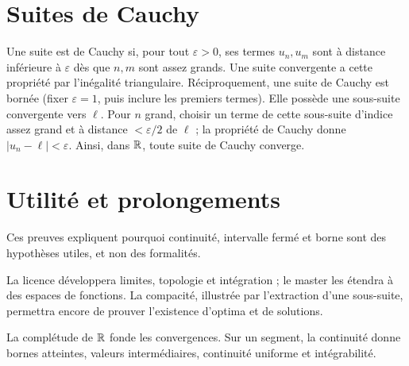 \documentclass[../cours_1re.tex]{subfiles}
\begin{document}
\begin{finchapitre}
\section{Suites de Cauchy}
Une suite est de Cauchy si, pour tout $\varepsilon>0$, ses termes $u_n,u_m$
sont à distance inférieure à $\varepsilon$ dès que $n,m$ sont assez grands.
Une suite convergente a cette propriété par l'inégalité triangulaire.
Réciproquement, une suite de Cauchy est bornée (fixer $\varepsilon=1$,
puis inclure les premiers termes). Elle possède une sous-suite convergente
vers $\ell$. Pour $n$ grand, choisir un terme de cette sous-suite
d'indice assez grand et à distance $<\varepsilon/2$ de $\ell$ ;
la propriété de Cauchy donne $|u_n-\ell|<\varepsilon$.
Ainsi, dans $\mathbb{R}$, toute suite de Cauchy converge.


\section{Utilité et prolongements}
Ces preuves expliquent pourquoi continuité, intervalle fermé et borne
sont des hypothèses utiles, et non des formalités.

La licence développera limites, topologie et intégration ; le master les
étendra à des espaces de fonctions. La compacité, illustrée par l'extraction
d'une sous-suite, permettra encore de prouver l'existence d'optima et de solutions.
\begin{retenir}
La complétude de $\mathbb{R}$ fonde les convergences. Sur un segment, la continuité
donne bornes atteintes, valeurs intermédiaires, continuité uniforme et intégrabilité.
\end{retenir}
\end{finchapitre}
\end{document}
